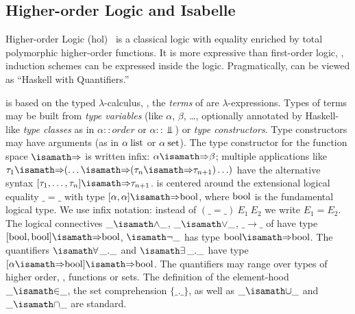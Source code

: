 \subsection{Higher-order Logic and Isabelle}\label{sec:higher-order-logic}
Higher-order Logic
(\acs{hol})~\cite{church:types:1940,andrews:introduction:2002} is a
classical logic with equality enriched by total polymorphic
higher-order functions. It is more expressive than first-order logic,
\eg, induction schemes can be expressed inside the
logic. Pragmatically, \HOL can be viewed as ``Haskell with
Quantifiers.''

\HOL is based on the typed $\lambda$-calculus, \ie, the \emph{terms} of \HOL are
$\lambda$-expressions.  Types of terms may be built from \emph{type
  variables} (like $\alpha$, $\beta$, \ldots, optionally
annotated by Haskell-like \emph{type classes} as in
$\alpha::order$ or $\alpha::\Bot$) or \emph{type constructors}. Type constructors may have arguments (as in $\alpha\:\mathrm{list}$
or $\alpha\:\mathrm{set}$). The type constructor for the function space
$\isasymRightarrow$ is written infix: $\alpha \isasymRightarrow \beta$; multiple
applications like
$\tau_1\isasymRightarrow(\ldots\isasymRightarrow(\tau_n\isasymRightarrow\tau_{n+1})\ldots)$
have the alternative syntax $[\tau_1, \ldots, \tau_n] \isasymRightarrow
\tau_{n+1}$. \HOL is centered around the extensional logical equality $\_=\_$
with type $[\alpha, \alpha] \isasymRightarrow \HolBoolean$, where $\mathrm{bool}$
is the fundamental logical type.  We use infix notation: instead of
$(\_=\_)~E_1~E_2$ we write $E_1=E_2$. The logical connectives $\_\isasymand\_$,
$\_\isasymor\_$, $\_\to\_$ of \HOL have type $[\HolBoolean, \HolBoolean]
\isasymRightarrow \HolBoolean$, $\isasymnot\_$ has type $\HolBoolean
\isasymRightarrow \HolBoolean$. The quantifiers $\isasymforall\_.\_$ and
$\isasymexists\_.\_$ have type $[\alpha \isasymRightarrow \HolBoolean]
\isasymRightarrow \HolBoolean$. The quantifiers may range over types of higher
order, \ie, functions or sets. 
The definition of the element-hood $\_\isasymin\_$, the set comprehension
$\{\_.\_\}$, as well as $\_\isasymunion\_$ and $\_\isasyminter\_$ are standard.

